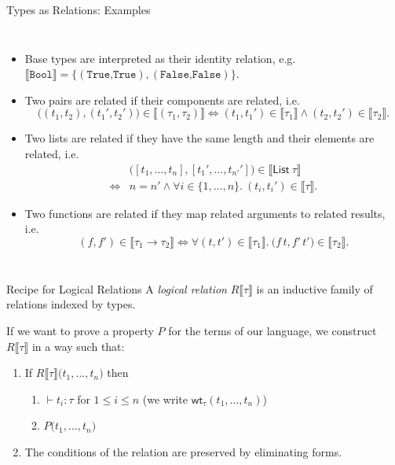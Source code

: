 \documentclass{beamer}
\newcommand{\fromto}[2]{\{#1,\dotsc,#2\}}
\newcommand{\denot}[1]{\llbracket#1\rrbracket}
\newcommand{\listt}[1]{\mathsf{List}~#1}
\newcommand{\haskell}[1]{\texttt{#1}}
\newcommand{\wt}[1]{\mathsf{wt}_{#1}}
\begin{document}
\begin{frame}{Types as Relations: Examples}
\begin{columns}
	\column{\dimexpr\paperwidth-10pt}
\begin{itemize}[<+->]
  \item Base types are interpreted as their identity relation,
    e.g.\
    $\denot{\haskell{Bool}}=\{(\haskell{True,True}),(\haskell{False,False})\}$.
  \item Two pairs are related if their components are related, i.e.
\vspace{-0.5\baselineskip}
\begin{equation*}
	\bigl((t_1,t_2),(t_1',t_2')\bigr)\in\denot{(\tau_1,\tau_2)} \iff (t_1,t_1')\in\denot{\tau_1}\land (t_2,t_2')\in\denot{\tau_2}.
\end{equation*}
  \item Two lists are related if they have the same length and their elements are related, i.e.
\vspace{-0.5\baselineskip}
\begin{align*}
&\bigl([t_1,\dotsc,t_n],[t_1',\dotsc,t_{n'}']\bigr)\in \denot{\listt{\tau}}\\
\iff&n = n' \land \forall i\in\fromto{1}{n}.\ (t_i,t_i')\in \denot{\tau}.
\end{align*}
  \item Two functions are related if they map related arguments to related results, i.e.
\vspace{-0.5\baselineskip}
\begin{equation*}
	(f,f')\in \denot{\tau_1 \to \tau_2} \iff \forall (t,t')\in \denot{\tau_1}.~\bigl(f\, t, f'\, t'\bigr)\in\denot{\tau_2}.
\end{equation*}
\end{itemize}
\end{columns}
\end{frame}

\begin{frame}{Recipe for Logical Relations}
A \emph{logical relation} $R\denot{\tau}$ is an inductive family of relations indexed by types.


\pause
If we want to prove a property $P$ for the terms of our language,
we construct $R\denot{\tau}$ in a way such that:
\begin{enumerate}[<+->]
  \item If $R\denot{\tau}\bigl(t_1,\dotsc,t_n\bigr)$ then
  \begin{enumerate}
    \item $\vdash t_i : \tau$ for $1\leq i \leq n$ (we write $\wt{\tau}(t_1,\dotsc,t_n)$)
    \item $P\bigl(t_1,\dotsc,t_n\bigr)$
  \end{enumerate}
  \item The conditions of the relation are preserved by eliminating forms.
\end{enumerate}

\end{frame}
\end{document}
